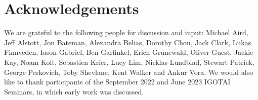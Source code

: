 \documentclass[12pt]{article}
\begin{document}
\section{Acknowledgements}
We are grateful to the following people for discussion and input: Michael Aird, Jeff Alstott, Jon Bateman, Alexandra Belias, Dorothy Chou, Jack Clark, Lukas Finnveden, Iason Gabriel, Ben Garfinkel, Erich Grunewald, Oliver Guest, Jackie Kay, Noam Kolt, Sebastien Krier, Lucy Lim, Nicklas Lundblad, Stewart Patrick, George Perkovich, Toby Shevlane, Kent Walker and Ankur Vora.
We would also like to thank participants of the September 2022 and June 2023 IGOTAI Seminars, in which
early work was discussed.



\end{document}

